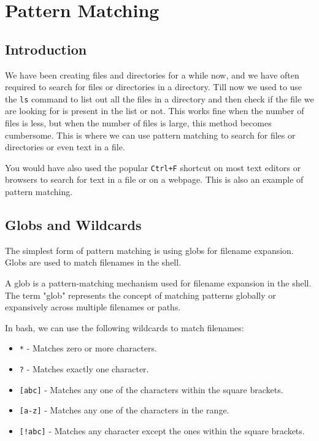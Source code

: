 \setchapterpreamble[u]{\margintoc}
\chapter{Pattern Matching}

\section{Introduction}

We have been creating files and directories for a while now,
and we have often required to search for files or directories
in a directory. Till now we used to use the \texttt{ls} command
to list out all the files in a directory and then check if the
file we are looking for is present in the list or not. This
works fine when the number of files is less, but when the number
of files is large, this method becomes cumbersome. This is where
we can use pattern matching to search for files or directories
or even text in a file.

You would have also used the popular \texttt{Ctrl+F} shortcut
on most text editors or browsers to search for text in a file
or on a webpage. This is also an example of pattern matching.

\section{Globs and Wildcards}

The simplest form of pattern matching is using globs for filename
expansion. Globs are used to match filenames in the shell.

\begin{definition}[Glob]
A glob is a pattern-matching mechanism used for filename expansion in the shell.
The term "glob" represents the concept of matching patterns globally or
expansively across multiple filenames or paths.
\end{definition}

In bash, we can use the following wildcards to match filenames:

\begin{itemize}
    \item \texttt{*} - Matches zero or more characters.
    \item \texttt{?} - Matches exactly one character.
    \item \texttt{[abc]} - Matches any one of the characters within the square brackets.
    \item \texttt{[a-z]} - Matches any one of the characters in the range.
    \item \texttt{[!abc]} - Matches any character except the ones within the square brackets.
\end{itemize}

